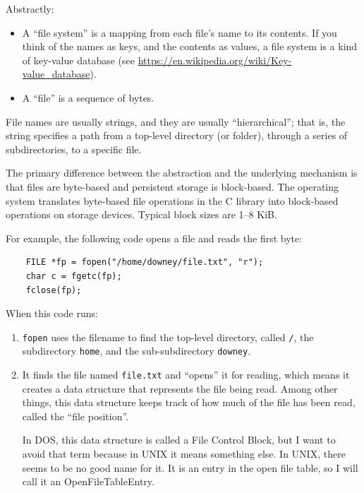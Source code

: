 \documentclass[12pt]{book}
\begin{document}
{Abstractly:

\begin{itemize}

\item A ``file system'' is a mapping from each file's name to its contents.
If you think of the names as keys, and the contents as values,
a file system is a kind of key-value database
(see \url{https://en.wikipedia.org/wiki/Key-value_database}).

\item A ``file'' is a sequence of bytes.

\end{itemize}

File names are usually strings, and they are usually ``hierarchical'';
that is, the string specifies a path from a top-level directory (or
folder), through a series of subdirectories, to a specific file.

The primary difference between the abstraction and the underlying
mechanism is that files are byte-based and persistent storage is
block-based.  The operating system translates byte-based file operations 
in the C library into block-based operations on storage devices.
Typical block sizes are 1--8 KiB.

For example, the following code opens a file and reads the first byte:

\begin{verbatim}
    FILE *fp = fopen("/home/downey/file.txt", "r");
    char c = fgetc(fp);
    fclose(fp);
\end{verbatim}

When this code runs:

\begin{enumerate}

\item {\tt fopen} uses the filename to find the top-level directory,
  called \verb"/", the subdirectory {\tt home}, and the
  sub-subdirectory {\tt downey}.

\item It finds the file named {\tt file.txt} and ``opens'' it for
  reading, which means it creates a data structure that represents the
  file being read.  Among other things, this data structure
  keeps track of how much of the file has been read, called the ``file
  position''.

  In DOS, this data structure is called a File Control Block, but I
  want to avoid that term because in UNIX it means something else.  In
  UNIX, there seems to be no good name for it.  It is an entry in the
  open file table, so I will call it an OpenFileTableEntry.


\end{enumerate}}
\end{document}
